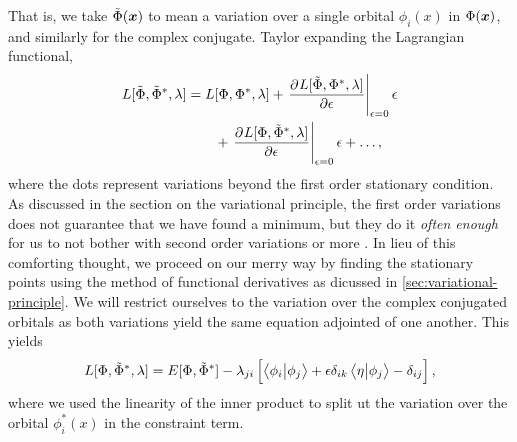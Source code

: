             That is, we take $\tilde{\Phi}(\boldsymbol{x})$ to mean a variation over a
            single orbital $\phi_i(x)$ in $\Phi(\boldsymbol{x})$, and similarly for the
            complex conjugate.
            Taylor expanding the Lagrangian functional,
            \begin{align}
                \lagrangianfunc{\tilde{\slat}, \tilde{\slat}^{*}, \lambda}
                &=
                \lagrangianfunc{\slat, \slat^{*}, \lambda}
                +
                \left.
                \dpd{
                    \lagrangianfunc{\tilde{\slat}, \slat^{*}, \lambda}
                }{\epsilon}
                \right\lvert_{\epsilon = 0}
                \epsilon
                \nonumber \\
                &\qquad
                +
                \left.
                \dpd{
                    \lagrangianfunc{\slat, \tilde{\slat}^{*}, \lambda}
                }{\epsilon}
                \right\lvert_{\epsilon = 0}
                \epsilon
                + \dots,
            \end{align}
            where the dots represent variations beyond the first order
            stationary condition.
            As discussed in the section on the variational principle, the first
            order variations does not guarantee that we have found a minimum,
            but they do it \emph{often enough} for us to not bother with second
            order variations or more \cite{szabo1996modern}.
            In lieu of this comforting thought, we proceed on our merry way by
            finding the stationary points using the method of functional
            derivatives as dicussed in \autoref{sec:variational-principle}.
            We will restrict ourselves to the variation over the complex
            conjugated orbitals as both variations yield the same equation
            adjointed of one another.
            This yields
            \begin{align}
                L[\Phi, \tilde{\Phi}^{*}, \lambda]
                =
                E[\Phi, \tilde{\Phi}^{*}]
                - \lambda_{ji}\left[ 
                    \braket{\phi_i}{\phi_j}
                    + \epsilon \delta_{ik}\braket{\eta}{\phi_j}
                    - \delta_{ij}
                 \right],
            \end{align}
            where we used the linearity of the inner product to split ut the
            variation over the orbital $\phi^{*}_i(x)$ in the constraint term.
